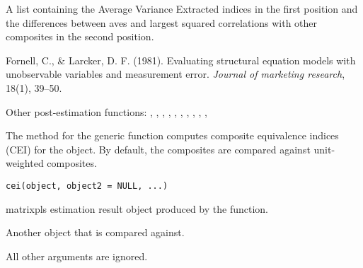 \documentclass[a4paper]{book}
\begin{document}
%
\begin{Value}
A list containing the Average Variance Extracted indices in the first position and the differences
between aves and largest squared correlations with other composites in the second position.
\end{Value}
%
\begin{References}\relax
Fornell, C., \& Larcker, D. F. (1981). Evaluating structural equation models with unobservable variables and measurement error. \emph{Journal of marketing research}, 18(1), 39–50.
\end{References}
%
\begin{SeeAlso}\relax
Other post-estimation functions: 
,
,
,
,
,
,
,
,
,
,
\end{SeeAlso}
%
\begin{Description}\relax
The  method for the generic function  computes 
composite equivalence indices (CEI) for the  object. By
default, the composites are compared against unit-weighted composites.
\end{Description}
%
\begin{Usage}
\begin{verbatim}
cei(object, object2 = NULL, ...)
\end{verbatim}
\end{Usage}
%
\begin{Arguments}
\begin{ldescription}
\item[\code{object}] matrixpls estimation result object produced by the  function.

\item[\code{object2}] Another  object that  is
compared against.

\item[\code{...}] All other arguments are ignored.
\end{ldescription}
\end{Arguments}
%
\end{document}
